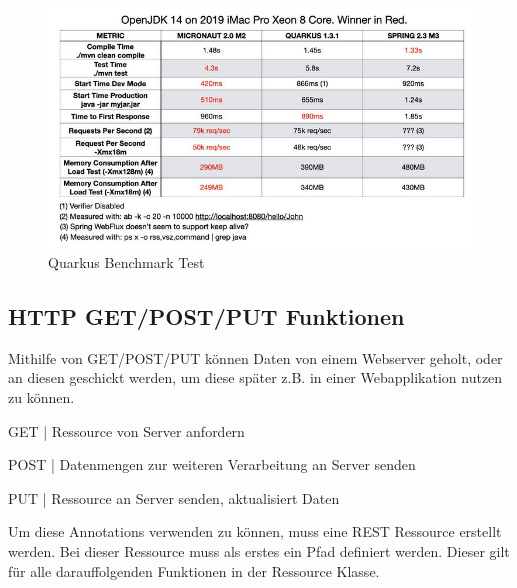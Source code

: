 \begin{figure}
    \centering
    \includegraphics[scale=0.8]{pics/quarkus_benchmark.jpg}
    \caption{Quarkus Benchmark Test \cite{MicrVSQuarVSSprin}}
    \label{fig:impl:Quarkusbenchmark}
\end{figure}
 

\subsection{HTTP GET/POST/PUT Funktionen}
Mithilfe von GET/POST/PUT können Daten von einem Webserver geholt, oder an diesen geschickt werden, um diese später z.B. in einer Webapplikation nutzen zu können.
 
\begin{compactitem}
    \item GET   |   Ressource von Server anfordern 
    \item POST  |   Datenmengen zur weiteren Verarbeitung an Server senden
    \item PUT   |   Ressource an Server senden, aktualisiert Daten
\end{compactitem}

Um diese Annotations verwenden zu können, muss eine REST Ressource erstellt werden.
Bei dieser Ressource muss als erstes ein Pfad definiert werden. Dieser gilt für alle darauffolgenden Funktionen in der Ressource Klasse.
 
